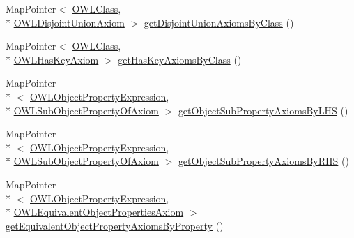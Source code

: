 \begin{DoxyCompactItemize}
\item 
Map\-Pointer$<$ \hyperlink{interfaceorg_1_1semanticweb_1_1owlapi_1_1model_1_1_o_w_l_class}{O\-W\-L\-Class}, \\*
\hyperlink{interfaceorg_1_1semanticweb_1_1owlapi_1_1model_1_1_o_w_l_disjoint_union_axiom}{O\-W\-L\-Disjoint\-Union\-Axiom} $>$ \hyperlink{classuk_1_1ac_1_1manchester_1_1cs_1_1owl_1_1owlapi_1_1_abstract_internals_impl_a7fd9dd5eb0907910be6f8ef65ee873e5}{get\-Disjoint\-Union\-Axioms\-By\-Class} ()
\item 
Map\-Pointer$<$ \hyperlink{interfaceorg_1_1semanticweb_1_1owlapi_1_1model_1_1_o_w_l_class}{O\-W\-L\-Class}, \\*
\hyperlink{interfaceorg_1_1semanticweb_1_1owlapi_1_1model_1_1_o_w_l_has_key_axiom}{O\-W\-L\-Has\-Key\-Axiom} $>$ \hyperlink{classuk_1_1ac_1_1manchester_1_1cs_1_1owl_1_1owlapi_1_1_abstract_internals_impl_a0c196a1142a6edd74ebd8206c1028564}{get\-Has\-Key\-Axioms\-By\-Class} ()
\item 
Map\-Pointer\\*
$<$ \hyperlink{interfaceorg_1_1semanticweb_1_1owlapi_1_1model_1_1_o_w_l_object_property_expression}{O\-W\-L\-Object\-Property\-Expression}, \\*
\hyperlink{interfaceorg_1_1semanticweb_1_1owlapi_1_1model_1_1_o_w_l_sub_object_property_of_axiom}{O\-W\-L\-Sub\-Object\-Property\-Of\-Axiom} $>$ \hyperlink{classuk_1_1ac_1_1manchester_1_1cs_1_1owl_1_1owlapi_1_1_abstract_internals_impl_a30a683276e8284b6046de0c8905e1b61}{get\-Object\-Sub\-Property\-Axioms\-By\-L\-H\-S} ()
\item 
Map\-Pointer\\*
$<$ \hyperlink{interfaceorg_1_1semanticweb_1_1owlapi_1_1model_1_1_o_w_l_object_property_expression}{O\-W\-L\-Object\-Property\-Expression}, \\*
\hyperlink{interfaceorg_1_1semanticweb_1_1owlapi_1_1model_1_1_o_w_l_sub_object_property_of_axiom}{O\-W\-L\-Sub\-Object\-Property\-Of\-Axiom} $>$ \hyperlink{classuk_1_1ac_1_1manchester_1_1cs_1_1owl_1_1owlapi_1_1_abstract_internals_impl_a164250dc53d148c9b46100de5de6a546}{get\-Object\-Sub\-Property\-Axioms\-By\-R\-H\-S} ()
\item 
Map\-Pointer\\*
$<$ \hyperlink{interfaceorg_1_1semanticweb_1_1owlapi_1_1model_1_1_o_w_l_object_property_expression}{O\-W\-L\-Object\-Property\-Expression}, \\*
\hyperlink{interfaceorg_1_1semanticweb_1_1owlapi_1_1model_1_1_o_w_l_equivalent_object_properties_axiom}{O\-W\-L\-Equivalent\-Object\-Properties\-Axiom} $>$ \hyperlink{classuk_1_1ac_1_1manchester_1_1cs_1_1owl_1_1owlapi_1_1_abstract_internals_impl_a6d1a65159cadc9a516520a6520caf77c}{get\-Equivalent\-Object\-Property\-Axioms\-By\-Property} ()

\end{DoxyCompactItemize}
